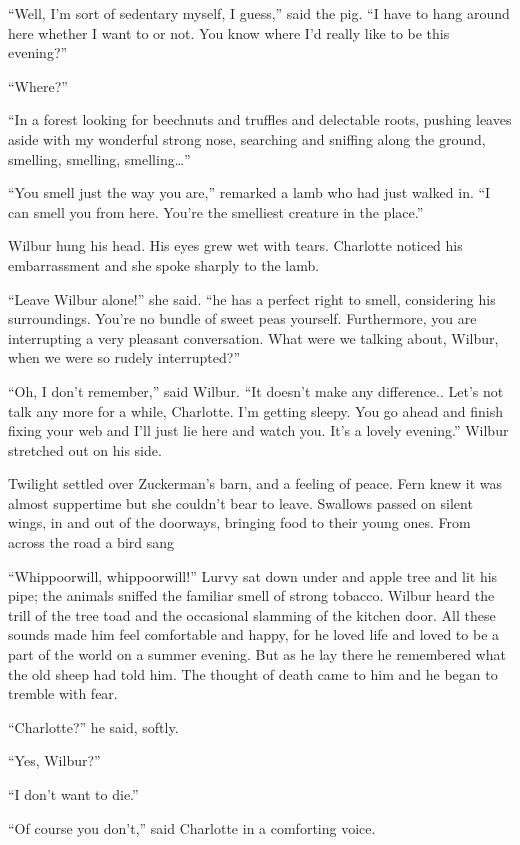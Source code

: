 \documentclass[a4paper, oneside]{book}
\begin{document}
``Well, I’m sort of sedentary myself, I guess,'' said the pig. ``I
have to hang around here whether I want to or not. You know
where I'd really like to be this evening?''

``Where?''

``In a forest looking for beechnuts and truffles and delectable
roots, pushing leaves aside with my wonderful strong nose,
searching and sniffing along the ground, smelling, smelling,
smelling…''

``You smell just the way you are,'' remarked a lamb who had
just walked in. ``I can smell you from here. You're the smelliest
creature in the place.''

Wilbur hung his head. His eyes grew wet with tears. Charlotte
noticed his embarrassment and she spoke sharply to the lamb.

 ``Leave Wilbur alone!'' she said. ``he has a perfect right to smell,
considering his surroundings. You're no bundle of sweet peas
yourself. Furthermore, you are interrupting a very pleasant
conversation. What were we talking about, Wilbur, when we were
so rudely interrupted?'' 

``Oh, I don't remember,'' said Wilbur. ``It doesn't make any
difference.. Let's not talk any more for a while, Charlotte. I'm
getting sleepy. You go ahead and finish fixing your web and I'll just
lie here and watch you. It's a lovely evening.'' Wilbur stretched out
on his side.

 Twilight settled over Zuckerman's barn, and a feeling of peace.
Fern knew it was almost suppertime but she couldn't bear to leave.
Swallows passed on silent wings, in and out of the doorways,
bringing food to their young ones. From across the road a bird sang

``Whippoorwill, whippoorwill!'' Lurvy sat down under and apple 
tree and lit his pipe; the animals sniffed the familiar smell of strong
tobacco. Wilbur heard the trill of the tree toad and the occasional
slamming of the kitchen door. All these sounds made him feel
comfortable and happy, for he loved life and loved to be a part of
the world on a summer evening. But as he lay there he
remembered what the old sheep had told him. The thought of
death came to him and he began to tremble with fear. 

``Charlotte?'' he said, softly.

 ``Yes, Wilbur?''

 ``I don’t want to die.''

 ``Of course you don’t,'' said Charlotte in a comforting voice.
\end{document}
